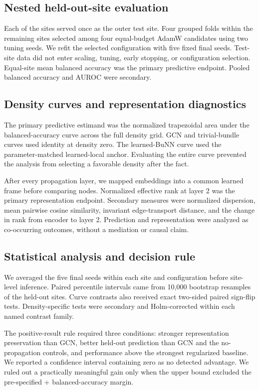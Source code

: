 \subsection{Nested held-out-site evaluation}

Each of the \StudySites{} sites served once as the outer test site. Four
grouped folds within the remaining sites selected among four equal-budget
AdamW candidates using two tuning seeds. We refit the selected configuration
with five fixed final seeds. Test-site data did not enter scaling, tuning,
early stopping, or configuration selection. Equal-site mean balanced accuracy
was the primary predictive endpoint. Pooled balanced accuracy and AUROC were
secondary.

\subsection{Density curves and representation diagnostics}

The primary predictive estimand was the normalized trapezoidal area under the
balanced-accuracy curve across the full density grid. GCN and trivial-bundle
curves used identity at density zero. The learned-BuNN curve used the
parameter-matched learned-local anchor. Evaluating the entire curve prevented
the analysis from selecting a favorable density after the fact.

After every propagation layer, we mapped embeddings into a common learned
frame before comparing nodes. Normalized effective rank at layer 2 was the
primary representation endpoint. Secondary measures were normalized
dispersion, mean pairwise cosine similarity, invariant edge-transport
distance, and the change in rank from encoder to layer 2. Prediction and
representation were analyzed as co-occurring outcomes, without a mediation or
causal claim.

\subsection{Statistical analysis and decision rule}

We averaged the five final seeds within each site and configuration before
site-level inference. Paired percentile intervals came from 10,000 bootstrap
resamples of the \StudySites{} held-out sites. Curve contrasts also received
exact two-sided paired sign-flip tests. Density-specific tests were secondary
and Holm-corrected within each named contrast family.

The positive-result rule required three conditions: stronger representation
preservation than GCN, better held-out prediction than GCN and the
no-propagation controls, and performance above the strongest regularized
baseline. We reported a confidence interval containing zero as no detected
advantage. We ruled out a practically meaningful gain only when the upper
bound excluded the pre-specified +\PracticalMargin{} balanced-accuracy margin.

